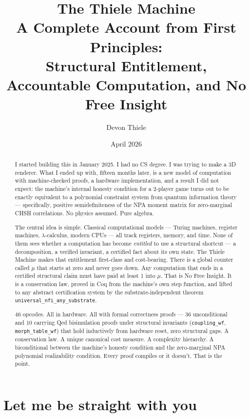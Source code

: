 \documentclass[11pt,a4paper]{article}
\title{The Thiele Machine\\[0.5em]
\large A Complete Account from First Principles:\\
Structural Entitlement, Accountable Computation, and No Free Insight}
\author{Devon Thiele}
\date{April 2026}
\theoremstyle{plain}
\theoremstyle{definition}
\theoremstyle{remark}
\begin{document}
\sloppy
\maketitle
\thispagestyle{empty}

\begin{abstract}
I started building this in January 2025. I had no CS degree. I was trying to make a 3D renderer. What I ended up with, fifteen months later, is a new model of computation with machine-checked proofs, a hardware implementation, and a result I did not expect: the machine's internal honesty condition for a 2-player game turns out to be exactly equivalent to a polynomial constraint system from quantum information theory --- specifically, positive semidefiniteness of the NPA moment matrix for zero-marginal CHSH correlations. No physics assumed. Pure algebra.

The central idea is simple. Classical computational models --- Turing machines, register machines, $\lambda$-calculus, modern CPUs --- all track registers, memory, and time. None of them sees whether a computation has become \emph{entitled} to use a structural shortcut --- a decomposition, a verified invariant, a certified fact about its own state. The Thiele Machine makes that entitlement first-class and cost-bearing. There is a global counter called $\mu$ that starts at zero and never goes down. Any computation that ends in a certified structural claim must have paid at least 1 into $\mu$. That is No Free Insight. It is a conservation law, proved in Coq from the machine's own step function, and lifted to any abstract certification system by the substrate-independent theorem \texttt{universal\_nfi\_any\_substrate}.

46 opcodes. All in hardware. All with formal correctness proofs --- 36 unconditional and 10 carrying Qed bisimulation proofs under structural invariants (\texttt{coupling\_wf}, \texttt{morph\_table\_wf}) that hold inductively from hardware reset, zero structural gaps. A conservation law. A unique canonical cost measure. A complexity hierarchy. A biconditional between the machine's honesty condition and the zero-marginal NPA polynomial realizability condition. Every proof compiles or it doesn't. That is the point.
\end{abstract}

\tableofcontents
\newpage

\section{Let me be straight with you}
\end{document}
